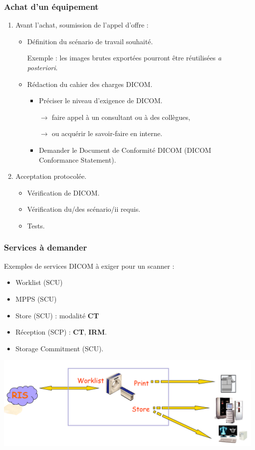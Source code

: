 \frame
{
	\frametitle{Achat d'un \'equipement}
	\begin{enumerate}
		\item Avant l'achat, soumission de l'appel d'offre :
		\begin{itemize}
			\item D\'efinition du sc\'enario de travail souhait\'e.

                Exemple : les images brutes export\'ees pourront \^etre r\'eutilis\'ees \emph{a posteriori}.
			\item R\'edaction du cahier des charges DICOM.
			\begin{itemize}
				\item Pr\'eciser le niveau d'exigence de DICOM.
				
				$\rightarrow$ faire appel \`a un consultant ou \`a des coll\`egues,
				
				$\rightarrow$ ou acqu\'erir le savoir-faire en interne.
				\item Demander le Document de Conformit\'e DICOM (DICOM Conformance Statement).
			\end{itemize}
		\end{itemize}
		\item Acceptation protocol\'ee.
		\begin{itemize}
			\item V\'erification de DICOM.
			\item V\'erification du/des sc\'enario/ii requis.
			\item Tests.
		\end{itemize}
	\end{enumerate}
}

\frame
{
	\frametitle{Services \`a demander}
	Exemples de services DICOM \`a exiger pour un scanner :
	\begin{itemize}
		\item Worklist (SCU)
		\item MPPS (SCU)
		\item Store (SCU)  : modalit\'e  \textbf{CT}
		\item R\'eception (SCP) : \textbf{CT}, \textbf{IRM}.
		\item Storage Commitment (SCU).
	\end{itemize}
	
	\begin{center}
		\includegraphics[width=\linewidth]{./figures/services-ct.png}
	\end{center}
}

